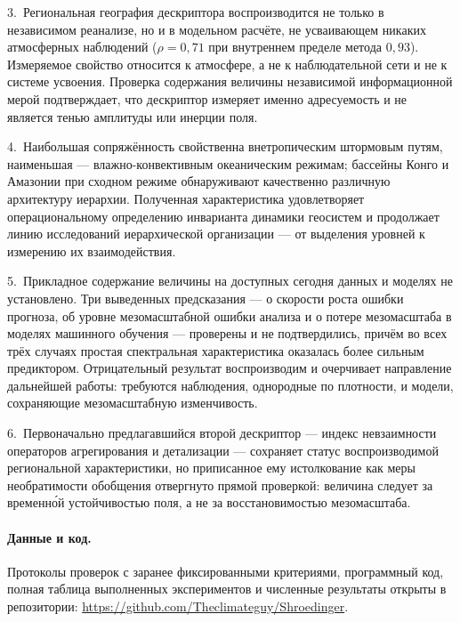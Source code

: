 \documentclass[11pt,a4paper]{article}
\begin{document}
3.~Региональная география дескриптора воспроизводится не только в независимом реанализе, но и в модельном расчёте, не усваивающем никаких атмосферных наблюдений ($\rho=0{,}71$ при внутреннем пределе метода $0{,}93$). Измеряемое свойство относится к атмосфере, а не к наблюдательной сети и не к системе усвоения. Проверка содержания величины независимой информационной мерой подтверждает, что дескриптор измеряет именно адресуемость и не является тенью амплитуды или инерции поля.

4.~Наибольшая сопряжённость свойственна внетропическим штормовым путям, наименьшая --- влажно-конвективным океаническим режимам; бассейны Конго и Амазонии при сходном режиме обнаруживают качественно различную архитектуру иерархии. Полученная характеристика удовлетворяет операциональному определению инварианта динамики геосистем и продолжает линию исследований иерархической организации --- от выделения уровней к измерению их взаимодействия.

5.~Прикладное содержание величины на доступных сегодня данных и моделях не установлено. Три выведенных предсказания --- о скорости роста ошибки прогноза, об уровне мезомасштабной ошибки анализа и о потере мезомасштаба в моделях машинного обучения --- проверены и не подтвердились, причём во всех трёх случаях простая спектральная характеристика оказалась более сильным предиктором. Отрицательный результат воспроизводим и очерчивает направление дальнейшей работы: требуются наблюдения, однородные по плотности, и модели, сохраняющие мезомасштабную изменчивость.

6.~Первоначально предлагавшийся второй дескриптор --- индекс невзаимности операторов агрегирования и детализации --- сохраняет статус воспроизводимой региональной характеристики, но приписанное ему истолкование как меры необратимости обобщения отвергнуто прямой проверкой: величина следует за временн\'{о}й устойчивостью поля, а не за восстановимостью мезомасштаба.

\paragraph{Данные и код.} Протоколы проверок с заранее фиксированными критериями, программный код, полная таблица выполненных экспериментов и численные результаты открыты в репозитории: \url{https://github.com/Theclimateguy/Shroedinger}.

\printbibliography[title={Список литературы}]
\end{document}

